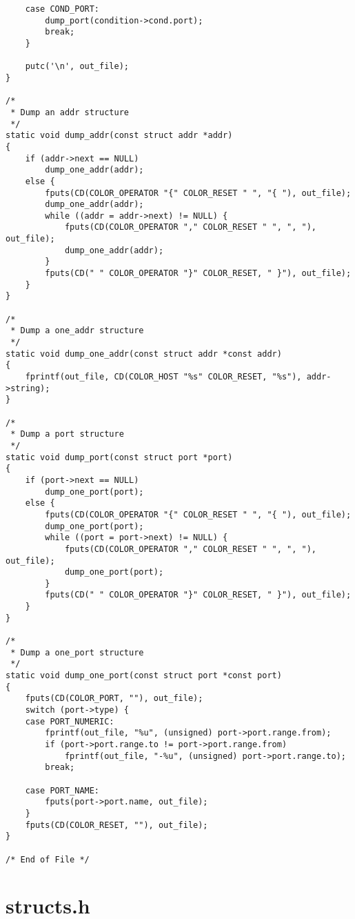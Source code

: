 \documentclass[a4paper,landscape,twocolumn,11pt]{article}
\begin{document}
\begin{lstlisting}
    case COND_PORT:
        dump_port(condition->cond.port);
        break;
    }

    putc('\n', out_file);
}

/*
 * Dump an addr structure
 */
static void dump_addr(const struct addr *addr)
{
    if (addr->next == NULL)
        dump_one_addr(addr);
    else {
        fputs(CD(COLOR_OPERATOR "{" COLOR_RESET " ", "{ "), out_file);
        dump_one_addr(addr);
        while ((addr = addr->next) != NULL) {
            fputs(CD(COLOR_OPERATOR "," COLOR_RESET " ", ", "), out_file);
            dump_one_addr(addr);
        }
        fputs(CD(" " COLOR_OPERATOR "}" COLOR_RESET, " }"), out_file);
    }
}

/*
 * Dump a one_addr structure
 */
static void dump_one_addr(const struct addr *const addr)
{
    fprintf(out_file, CD(COLOR_HOST "%s" COLOR_RESET, "%s"), addr->string);
}

/*
 * Dump a port structure
 */
static void dump_port(const struct port *port)
{
    if (port->next == NULL)
        dump_one_port(port);
    else {
        fputs(CD(COLOR_OPERATOR "{" COLOR_RESET " ", "{ "), out_file);
        dump_one_port(port);
        while ((port = port->next) != NULL) {
            fputs(CD(COLOR_OPERATOR "," COLOR_RESET " ", ", "), out_file);
            dump_one_port(port);
        }
        fputs(CD(" " COLOR_OPERATOR "}" COLOR_RESET, " }"), out_file);
    }
}

/*
 * Dump a one_port structure
 */
static void dump_one_port(const struct port *const port)
{
    fputs(CD(COLOR_PORT, ""), out_file);
    switch (port->type) {
    case PORT_NUMERIC:
        fprintf(out_file, "%u", (unsigned) port->port.range.from);
        if (port->port.range.to != port->port.range.from)
            fprintf(out_file, "-%u", (unsigned) port->port.range.to);
        break;

    case PORT_NAME:
        fputs(port->port.name, out_file);
    }
    fputs(CD(COLOR_RESET, ""), out_file);
}

/* End of File */
\end{lstlisting}

\bigskip\section*{structs.h}
\end{document}
